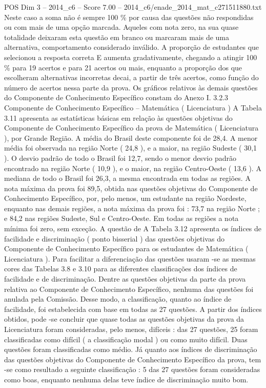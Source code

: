 \begin{textsample}{POS Dim 3 – 2014\_c6 – Score 7.00 – 2014\_c6/enade\_2014\_mat\_c271511880.txt}
Neste caso a soma não é sempre 100 \% por causa das questões não respondidas ou com mais de uma opção marcada.
Aqueles com nota zero, na sua quase totalidade deixaram esta questão em branco ou marcaram mais de uma alternativa, comportamento considerado inválido.
A proporção de estudantes que selecionou a resposta correta E aumenta gradativamente, chegando a atingir 100 \% para 19 acertos e para 21 acertos ou mais, enquanto a proporção dos que escolheram alternativas incorretas decai, a partir de três acertos, como função do número de acertos nessa parte da prova.
Os gráficos relativos às demais questões do Componente de Conhecimento Específico constam do Anexo I. 3.2.3 Componente de Conhecimento Específico – Matemática ( Licenciatura ) A Tabela 3.11 apresenta as estatísticas básicas em relação às questões objetivas do Componente de Conhecimento Específico da prova de Matemática ( Licenciatura ), por Grande Região.
A média do Brasil deste componente foi de 28,4.
A menor média foi observada na região Norte ( 24,8 ), e a maior, na região Sudeste ( 30,1 ).
O desvio padrão de todo o Brasil foi 12,7, sendo o menor desvio padrão encontrado na região Norte ( 10,9 ), e o maior, na região Centro-Oeste ( 13,6 ).
A mediana de todo o Brasil foi 26,3, a mesma encontrada em todas as regiões.
A nota máxima da prova foi 89,5, obtida nas questões objetivas do Componente de Conhecimento Específico, por, pelo menos, um estudante na região Nordeste, enquanto nas demais regiões, a nota máxima da prova foi : 73,7 na região Norte ; e 84,2 nas regiões Sudeste, Sul e Centro-Oeste.
Em todas as regiões a nota mínima foi zero, sem exceção.
A questão de A Tabela 3.12 apresenta os índices de facilidade e discriminação ( ponto bisserial ) das questões objetivas do Componente de Conhecimento Específico para os estudantes de Matemática ( Licenciatura ).
Para facilitar a diferenciação das questões usaram -se as mesmas cores das Tabelas 3.8 e 3.10 para as diferentes classificações dos índices de facilidade e de discriminação.
Dentre as questões objetivas da parte da prova relativa ao Componente de Conhecimento Específico, nenhuma das questões foi anulada pela Comissão.
Desse modo, a classificação, quanto ao índice de facilidade, foi estabelecida com base em todas as 27 questões.
A partir dos índices obtidos, pode -se concluir que quase todas as questões objetivas da prova da Licenciatura foram consideradas, pelo menos, difíceis : das 27 questões, 25 foram classificadas como difícil ( a classificação modal ) ou como muito difícil.
Duas questões foram classificadas como médio.
Já quanto aos índices de discriminação das questões objetivas do Componente de Conhecimento Específico da prova, tem -se como resultado a seguinte classificação : 5 das 27 questões foram consideradas como boas, enquanto nenhuma delas teve índice de discriminação muito bom.

\end{textsample}
